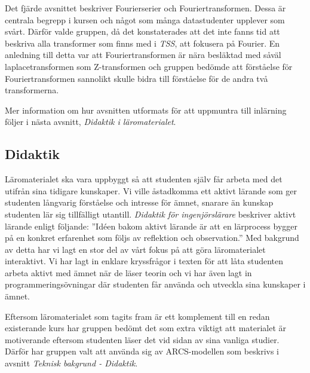 \documentclass[]{article}
\begin{document}
Det fjärde avsnittet beskriver Fourierserier och Fouriertransformen. Dessa är centrala begrepp i kursen och något som
många datastudenter upplever som svårt. Därför valde gruppen, då det konstaterades att det inte fanns tid att beskriva
alla transformer som finns med i \textit{TSS}, att fokusera på Fourier. En anledning till detta var att Fouriertransformen är nära besläktad med
såväl laplacetransformen som Z-transformen och gruppen bedömde att förståelse för Fouriertransformen sannolikt skulle
bidra till förståelse för de andra två transformerna.

Mer information om hur avsnitten utformats för att uppmuntra till inlärning följer i nästa avsnitt,
\textit{Didaktik i läromaterialet}.

\subsection{Didaktik}
Läromaterialet ska vara uppbyggt så att studenten själv får arbeta med det utifrån sina tidigare
kunskaper. Vi ville åstadkomma ett aktivt lärande som ger studenten långvarig förståelse och
intresse för ämnet, snarare än kunskap studenten lär sig tillfälligt utantill. \textit{Didaktik för
ingenjörslärare} beskriver aktivt lärande enligt följande: ”Idéen bakom aktivt lärande är att en
lärprocess bygger på en konkret erfarenhet som följs av reflektion och observation.” Med bakgrund av
detta har vi lagt en stor del av vårt fokus på att göra läromaterialet interaktivt. Vi har lagt in
enklare kryssfrågor i texten för att låta studenten arbeta aktivt med ämnet när de läser teorin och
vi har även lagt in programmeringsövningar där studenten får använda och utveckla sina kunskaper i
ämnet.

Eftersom läromaterialet som tagits fram är ett komplement till en redan existerande kurs har gruppen
bedömt det som extra viktigt att materialet är motiverande eftersom studenten läser det vid sidan av
sina vanliga studier. Därför har gruppen valt att använda sig av ARCS-modellen som beskrivs i avsnitt
\textit{Teknisk bakgrund - Didaktik}.
\end{document}
